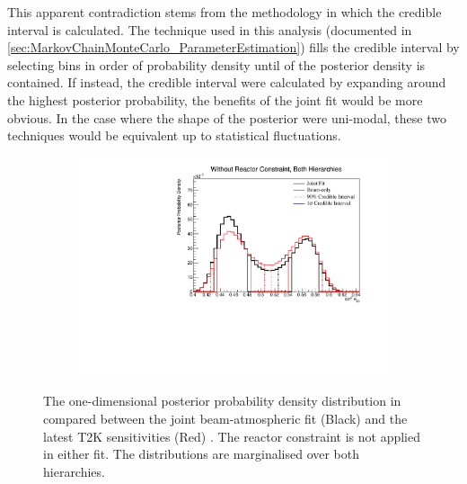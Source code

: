 This apparent contradiction stems from the methodology in which the credible interval is calculated. The technique used in this analysis (documented in \autoref{sec:MarkovChainMonteCarlo_ParameterEstimation}) fills the credible interval by selecting bins in order of probability density until  of the posterior density is contained. If instead, the credible interval were calculated by expanding around the highest posterior probability, the benefits of the joint fit would be more obvious. In the case where the shape of the posterior were uni-modal, these two techniques would be equivalent up to statistical fluctuations.

\begin{figure}[h]
  \begin{subfigure}[t]{0.98\textwidth}
    \includegraphics[width=\textwidth, trim={0mm 0mm 0mm 0mm}, clip,page=1]{Figures/OA/JointFit_OA2020_Comp_AsimovB/ContourComparison_1D_th23_BH_2_woRC_UnSmeared_CredibleInterval.pdf}
  \end{subfigure}
  \caption{The one-dimensional posterior probability density distribution in  compared between the joint beam-atmospheric fit (Black) and the latest T2K sensitivities (Red) \cite{Dunne2020-uf, t2k_tn_393}. The reactor constraint is not applied in either fit. The distributions are marginalised over both hierarchies.}
  \label{fig:OscillationAnalysis_JointFit_AsimovB_TH23}
\end{figure}

